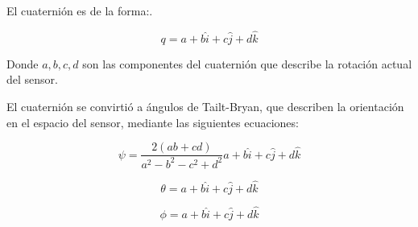 El cuaternión es de la forma:.

\begin{equation}
	q = a + b\hat{i} + c\hat{j} + d\hat{k}
	\label{eq:eqcuaternion}
\end{equation}

Donde $a, b, c, d$ son las componentes del cuaternión que describe la rotación actual del sensor.

El cuaternión se convirtió a ángulos de Tailt-Bryan, que describen la orientación en el espacio del sensor, mediante las siguientes ecuaciones:

\begin{equation}
	\psi = \frac{2(ab + cd)}{a^2 - b^2 - c^2 + d^2} a + b\hat{i} + c\hat{j} + d\hat{k}
	\label{eq:yaw}
\end{equation}

\begin{equation}
	\theta = a + b\hat{i} + c\hat{j} + d\hat{k}
	\label{eq:roll}
\end{equation}

\begin{equation}
	\phi = a + b\hat{i} + c\hat{j} + d\hat{k}
	\label{eq:pitch}
\end{equation}